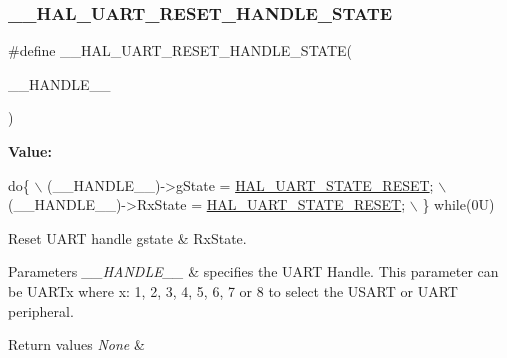 \subsubsection{\texorpdfstring{\+\_\+\+\_\+\+H\+A\+L\+\_\+\+U\+A\+R\+T\+\_\+\+R\+E\+S\+E\+T\+\_\+\+H\+A\+N\+D\+L\+E\+\_\+\+S\+T\+A\+TE}{\_\_HAL\_UART\_RESET\_HANDLE\_STATE}}
{\footnotesize\ttfamily \#define \+\_\+\+\_\+\+H\+A\+L\+\_\+\+U\+A\+R\+T\+\_\+\+R\+E\+S\+E\+T\+\_\+\+H\+A\+N\+D\+L\+E\+\_\+\+S\+T\+A\+TE(\begin{DoxyParamCaption}\item[{}]{\+\_\+\+\_\+\+H\+A\+N\+D\+L\+E\+\_\+\+\_\+ }\end{DoxyParamCaption})}

{\bfseries Value\+:}
\begin{DoxyCode}
\textcolor{keywordflow}{do}\{                                                   \(\backslash\)
                                                       (\_\_HANDLE\_\_)->gState = 
      \mbox{\hyperlink{group___u_a_r_t___exported___types_ggaf55d844a35379c204c90be5d1e8e50baa9c7d889fce61ccc717228d099a61d113}{HAL\_UART\_STATE\_RESET}};      \(\backslash\)
                                                       (\_\_HANDLE\_\_)->RxState = 
      \mbox{\hyperlink{group___u_a_r_t___exported___types_ggaf55d844a35379c204c90be5d1e8e50baa9c7d889fce61ccc717228d099a61d113}{HAL\_UART\_STATE\_RESET}};     \(\backslash\)
                                                     \} \textcolor{keywordflow}{while}(0U)
\end{DoxyCode}


Reset U\+A\+RT handle gstate \& Rx\+State. 


\begin{DoxyParams}{Parameters}
{\em \+\_\+\+\_\+\+H\+A\+N\+D\+L\+E\+\_\+\+\_\+} & specifies the U\+A\+RT Handle. This parameter can be U\+A\+R\+Tx where x\+: 1, 2, 3, 4, 5, 6, 7 or 8 to select the U\+S\+A\+RT or U\+A\+RT peripheral. \\
\hline
\end{DoxyParams}

\begin{DoxyRetVals}{Return values}
{\em None} & \\
\hline
\end{DoxyRetVals}
\mbox{\label{group___u_a_r_t___exported___macros_ga869439269c26e8dee93d49b1c7e67448}} 
